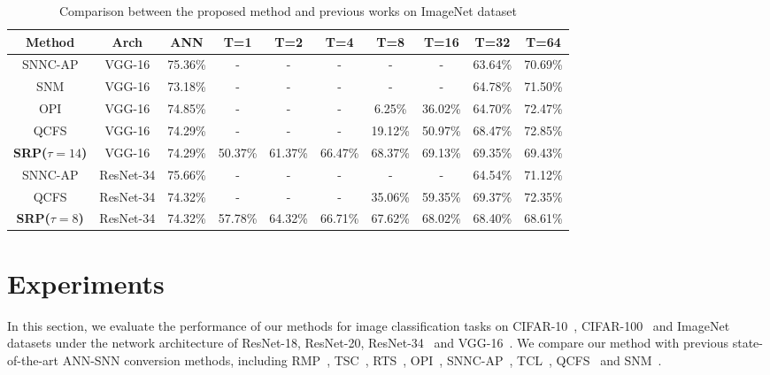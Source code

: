 \documentclass[letterpaper]{article} %
\begin{document}
\begin{table}[t]
    \caption{Comparison between the proposed method and previous works on ImageNet dataset}
    \renewcommand\arraystretch{1.15}
	\centering
	\begin{tabular}{cccccccccc}\hline
	
	Method & Arch & ANN & T=1 & T=2 & T=4 & T=8 & T=16 & T=32 & T=64 \\ \hline
	SNNC-AP & VGG-16 & 75.36\% & - & - & - & - & - & 63.64\% & 70.69\% \\\hline
	SNM & VGG-16 & 73.18\% & - & - & - & - & - & 64.78\% & 71.50\% \\\hline
	OPI & VGG-16 & 74.85\% & - & - & - & 6.25\% & 36.02\% & 64.70\% & 72.47\% \\\hline
	QCFS & VGG-16 & 74.29\% & - & - & - & 19.12\% & 50.97\% & 68.47\% & 72.85\% \\\hline
	
	\textbf{SRP($\tau=14$)} & VGG-16 & 74.29\% & 50.37\% & 61.37\% & 66.47\% & 68.37\% & 69.13\% & 69.35\% & 69.43\% \\ \hline
	SNNC-AP & ResNet-34 & 75.66\% & - & - & - & - & - & 64.54\% & 71.12\% \\\hline
	QCFS & ResNet-34 & 74.32\% & - & - & - & 35.06\% & 59.35\% & 69.37\% & 72.35\% \\\hline
	\textbf{SRP($\tau=8$)} & ResNet-34 & 74.32\% & 57.78\% & 64.32\% & 66.71\% & 67.62\% & 68.02\% & 68.40\% & 68.61\% \\ \hline
	\end{tabular}
	\label{table03}
\end{table}



\section{Experiments}
In this section, we evaluate the performance of our methods for image classification tasks on CIFAR-10~\cite{LeCun1998CIFAR10}, CIFAR-100~\cite{Krizhevsky2009CIFAR100} and ImageNet~\cite{Deng2009ImageNet} datasets under the network architecture of ResNet-18, ResNet-20, ResNet-34~\cite{he2016deep} and VGG-16~\cite{Simonyan2014VGG16}. 
 We compare our method with previous state-of-the-art ANN-SNN conversion methods, including RMP~\cite{han2020rmp}, 
 TSC~\cite{Han&Roy2020}, 
 RTS~\cite{deng2020optimal}, 
 OPI~\cite{Bu2022OPI}, SNNC-AP~\cite{li2021free}, TCL~\cite{ho2021tcl}, QCFS~\cite{bu2022optimal} and SNM~\cite{wang2022signed}.
\end{document}
